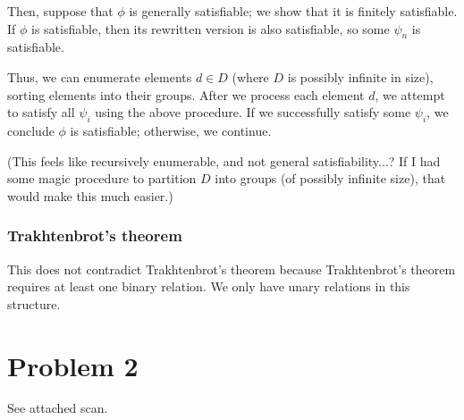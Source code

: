 \documentclass{article}
\begin{document}
Then, suppose that $\phi$ is generally satisfiable; we show that it is finitely
satisfiable. If $\phi$ is satisfiable, then its rewritten version is also
satisfiable, so some $\psi_n$ is satisfiable.

Thus, we can enumerate elements $d \in D$ (where $D$ is possibly infinite in
size), sorting elements into their groups. After we process each element $d$,
we attempt to satisfy all $\psi_i$ using the above procedure. If we
successfully satisfy some $\psi_i$, we conclude $\phi$ is satisfiable;
otherwise, we continue.

(This feels like recursively enumerable, and not general satisfiability...? If
I had some magic procedure to partition $D$ into groups (of possibly infinite
size), that would make this much easier.)

\subsubsection{Trakhtenbrot’s theorem}

This does not contradict Trakhtenbrot’s theorem because Trakhtenbrot’s theorem
requires at least one binary relation. We only have unary relations in this
structure.

\section{Problem 2}

See attached scan.
\end{document}
